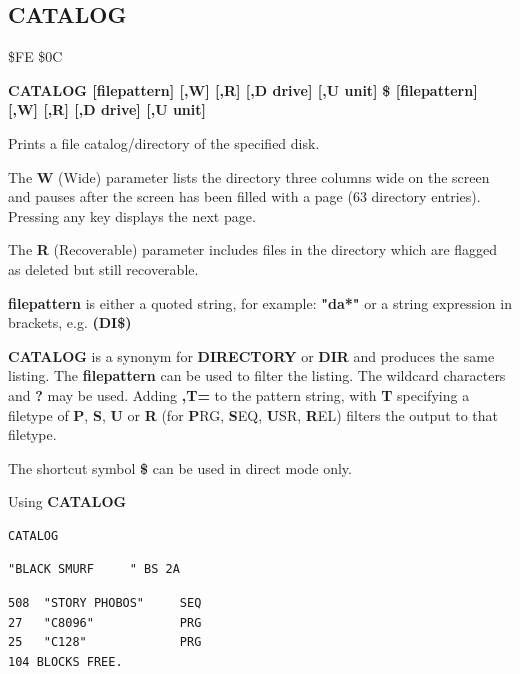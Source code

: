 \subsection{CATALOG}
\begin{description}[leftmargin=2cm,style=nextline]
\item [Token:]  \$FE \$0C
\item [Format:] {\bf CATALOG [filepattern] [,W] [,R] [,D drive] [,U unit] }
                {\bf \$ [filepattern] [,W] [,R] [,D drive] [,U unit] }
\item [Usage:]  Prints a file catalog/directory of the specified disk.

   The {\bf W} (Wide) parameter lists the directory three columns wide
   on the screen and pauses after the screen has been filled with a page
   (63 directory entries). Pressing any key displays the next page.

   The {\bf R} (Recoverable) parameter includes files in the
   directory which are flagged as deleted but still
   recoverable.

   {\bf filepattern} is either a quoted string, for example: {\bf "da*"} or
   a string expression in brackets, e.g. {\bf (DI\$)}

   \drivedefinition

   \unitdefinition

\item [Remarks:]
   {\bf CATALOG} is a synonym for {\bf DIRECTORY}
   or {\bf DIR} and produces the same listing.
   The {\bf filepattern} can be used to filter the listing.
   The wildcard characters {\bf *} and {\bf ?} may be used.
   Adding {\bf ,T=} to the pattern string, with {\bf T} specifying
   a filetype of {\bf P}, {\bf S}, {\bf U} or {\bf R}
   (for {\bf P}RG, {\bf S}EQ, {\bf U}SR, {\bf R}EL) filters the
   output to that filetype.

   The shortcut symbol {\bf \$} can be used in direct mode only.

\item [Examples:] Using {\bf CATALOG}

\begin{tcolorbox}[colback=black,coltext=white]
\verbatimfont{\codefont}
\begin{verbatim}
CATALOG
\end{verbatim}
\selectfont{\codefont 0}
\begin{tcolorbox}[colback=white,coltext=black,arc=0mm,boxrule=0mm,
       left*=0.5mm,right*=0mm,top=0mm,bottom=0mm,nobeforeafter,
       left skip=0.5mm,
       width=28mm,height=3mm,valign=center]
\begin{verbatim}
"BLACK SMURF     " BS 2A
\end{verbatim}
\end{tcolorbox}
\begin{verbatim}
508  "STORY PHOBOS"     SEQ
27   "C8096"            PRG
25   "C128"             PRG
104 BLOCKS FREE.
\end{verbatim}
\end{tcolorbox}


\end{description}
